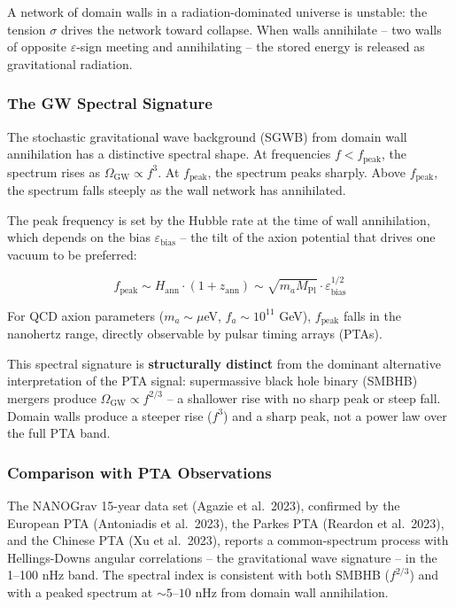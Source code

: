 A network of domain walls in a radiation-dominated universe is unstable:
the tension \(\sigma\) drives the network toward collapse. When walls
annihilate -- two walls of opposite \(\varepsilon\)-sign meeting and
annihilating -- the stored energy is released as gravitational
radiation.

\hypertarget{the-gw-spectral-signature}{%
\subsubsection{The GW Spectral
Signature}\label{the-gw-spectral-signature}}

The stochastic gravitational wave background (SGWB) from domain wall
annihilation has a distinctive spectral shape. At frequencies
\(f < f_\text{peak}\), the spectrum rises as
\(\Omega_\text{GW} \propto f^3\). At \(f_\text{peak}\), the spectrum
peaks sharply. Above \(f_\text{peak}\), the spectrum falls steeply as
the wall network has annihilated.

The peak frequency is set by the Hubble rate at the time of wall
annihilation, which depends on the bias \(\varepsilon_\text{bias}\) --
the tilt of the axion potential that drives one vacuum to be preferred:

\[f_\text{peak} \sim H_\text{ann} \cdot (1 + z_\text{ann}) \sim \sqrt{m_a M_\text{Pl}} \cdot \varepsilon_\text{bias}^{1/2}\]

For QCD axion parameters (\(m_a \sim \mu\)eV, \(f_a \sim 10^{11}\) GeV),
\(f_\text{peak}\) falls in the nanohertz range, directly observable by
pulsar timing arrays (PTAs).

This spectral signature is \textbf{structurally distinct} from the
dominant alternative interpretation of the PTA signal: supermassive
black hole binary (SMBHB) mergers produce
\(\Omega_\text{GW} \propto f^{2/3}\) -- a shallower rise with no sharp
peak or steep fall. Domain walls produce a steeper rise (\(f^3\)) and a
sharp peak, not a power law over the full PTA band.

\hypertarget{comparison-with-pta-observations}{%
\subsubsection{Comparison with PTA
Observations}\label{comparison-with-pta-observations}}

The NANOGrav 15-year data set (Agazie et al.~2023), confirmed by the
European PTA (Antoniadis et al.~2023), the Parkes PTA (Reardon et
al.~2023), and the Chinese PTA (Xu et al.~2023), reports a
common-spectrum process with Hellings-Downs angular correlations -- the
gravitational wave signature -- in the 1--100 nHz band. The spectral
index is consistent with both SMBHB (\(f^{2/3}\)) and with a peaked
spectrum at \(\sim 5\)--\(10\) nHz from domain wall annihilation.

